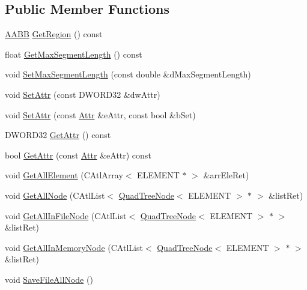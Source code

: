 \subsection*{Public Member Functions}
\begin{DoxyCompactItemize}
\item 
\hyperlink{struct_a_a_b_b}{A\+A\+B\+B} \hyperlink{class_c_g_quad_tree_a4009c22cb4e5bdfbd0d969189d409513}{Get\+Region} () const 
\item 
float \hyperlink{class_c_g_quad_tree_a839c02875e78dc762378da5247657ea8}{Get\+Max\+Segment\+Length} () const 
\item 
void \hyperlink{class_c_g_quad_tree_aab1acfc45f65a7a7dc8a74393e9f3804}{Set\+Max\+Segment\+Length} (const double \&d\+Max\+Segment\+Length)
\item 
void \hyperlink{class_c_g_quad_tree_a117fea806b387f66f0ef5628699be4db}{Set\+Attr} (const D\+W\+O\+R\+D32 \&dw\+Attr)
\item 
void \hyperlink{class_c_g_quad_tree_a15ace47567ee830469d271ecbe0cbf76}{Set\+Attr} (const \hyperlink{class_c_g_quad_tree_a236a06574bc2a4206959053a2339982e}{Attr} \&e\+Attr, const bool \&b\+Set)
\item 
D\+W\+O\+R\+D32 \hyperlink{class_c_g_quad_tree_a323c16b260db865deb47e60a2b19ff31}{Get\+Attr} () const 
\item 
bool \hyperlink{class_c_g_quad_tree_a0cbea589044da0ff249693c69a3e3fb2}{Get\+Attr} (const \hyperlink{class_c_g_quad_tree_a236a06574bc2a4206959053a2339982e}{Attr} \&e\+Attr) const 
\item 
void \hyperlink{class_c_g_quad_tree_ab6ff21001ea591dce7335e6958a0c506}{Get\+All\+Element} (C\+Atl\+Array$<$ E\+L\+E\+M\+E\+N\+T $\ast$ $>$ \&arr\+Ele\+Ret)
\item 
void \hyperlink{class_c_g_quad_tree_af82bd25d509d30a5a068c75901797197}{Get\+All\+Node} (C\+Atl\+List$<$ \hyperlink{class_quad_tree_node}{Quad\+Tree\+Node}$<$ E\+L\+E\+M\+E\+N\+T $>$ $\ast$ $>$ \&list\+Ret)
\item 
void \hyperlink{class_c_g_quad_tree_a5b7a730fb6372f36c486097327165066}{Get\+All\+In\+File\+Node} (C\+Atl\+List$<$ \hyperlink{class_quad_tree_node}{Quad\+Tree\+Node}$<$ E\+L\+E\+M\+E\+N\+T $>$ $\ast$ $>$ \&list\+Ret)
\item 
void \hyperlink{class_c_g_quad_tree_a0536685dfa4a23d099fa1f8480ea2830}{Get\+All\+In\+Memory\+Node} (C\+Atl\+List$<$ \hyperlink{class_quad_tree_node}{Quad\+Tree\+Node}$<$ E\+L\+E\+M\+E\+N\+T $>$ $\ast$ $>$ \&list\+Ret)
\item 
void \hyperlink{class_c_g_quad_tree_afe737245a182e8058ac19a018b7dcbd8}{Save\+File\+All\+Node} ()

\end{DoxyCompactItemize}
